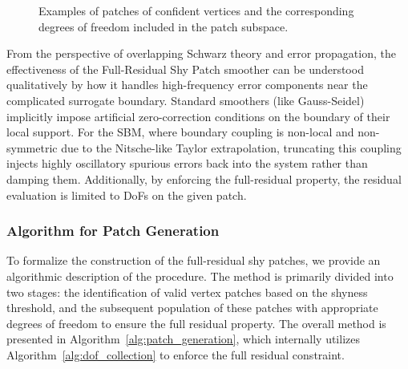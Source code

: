 \documentclass{elsarticle}
\begin{document}
\begin{figure}[!ht]
    \centering
    
    \caption{
        Examples of patches of confident vertices and the corresponding degrees of freedom included in the patch subspace.
    }
    \label{fig:examples_patches}
\end{figure}

From the perspective of overlapping Schwarz theory and error propagation, the effectiveness of the Full-Residual Shy
Patch smoother can be understood qualitatively by how it handles high-frequency error components near the complicated
surrogate boundary. Standard smoothers (like Gauss-Seidel) implicitly impose artificial zero-correction conditions on
the boundary of their local support. For the SBM, where boundary coupling is non-local and non-symmetric due to the
Nitsche-like Taylor extrapolation, truncating this coupling injects highly oscillatory spurious errors back into the
system rather than damping them. Additionally, by enforcing the full-residual property, the residual evaluation is
limited to DoFs on the given patch.

\subsubsection{Algorithm for Patch Generation}
\label{sec:patch_algorithm}
To formalize the construction of the full-residual shy patches, we provide an algorithmic description of the procedure. The method is primarily divided into two stages: the identification of valid vertex patches based on the shyness threshold, and the subsequent population of these patches with appropriate degrees of freedom to ensure the full residual property. The overall method is presented in Algorithm~\ref{alg:patch_generation}, which internally utilizes Algorithm~\ref{alg:dof_collection} to enforce the full residual constraint.
\end{document}

